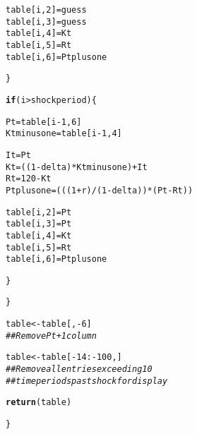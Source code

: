 \documentclass{article}\usepackage[]{graphicx}\usepackage[]{color}
\makeatletter
\newcommand{\hlnum}[1]{\textcolor[rgb]{0.686,0.059,0.569}{#1}}%
\newcommand{\hlcom}[1]{\textcolor[rgb]{0.678,0.584,0.686}{\textit{#1}}}%
\newcommand{\hlopt}[1]{\textcolor[rgb]{0,0,0}{#1}}%
\newcommand{\hlstd}[1]{\textcolor[rgb]{0.345,0.345,0.345}{#1}}%
\newcommand{\hlkwa}[1]{\textcolor[rgb]{0.161,0.373,0.58}{\textbf{#1}}}%
\newcommand{\hlkwb}[1]{\textcolor[rgb]{0.69,0.353,0.396}{#1}}%
\newcommand{\hlkwd}[1]{\textcolor[rgb]{0.737,0.353,0.396}{\textbf{#1}}}%
\newenvironment{kframe}{%
 \def\at@end@of@kframe{}%
 \ifinner\ifhmode%
  \def\at@end@of@kframe{\end{minipage}}%
  \begin{minipage}{\columnwidth}%
 \fi\fi%
 \def\FrameCommand##1{\hskip\@totalleftmargin \hskip-\fboxsep
 \colorbox{shadecolor}{##1}\hskip-\fboxsep
     \hskip-\linewidth \hskip-\@totalleftmargin \hskip\columnwidth}%
 \MakeFramed {\advance\hsize-\width
   \@totalleftmargin\z@ \linewidth\hsize
   \@setminipage}}%
 {\par\unskip\endMakeFramed%
 \at@end@of@kframe}
\newenvironment{knitrout}{}{} %
\makeatother
\begin{document}
\begin{knitrout}
\begin{kframe}
\begin{alltt}
      \hlstd{table[i,}\hlnum{2}\hlstd{]} \hlkwb{=} \hlstd{guess}
      \hlstd{table[i,}\hlnum{3}\hlstd{]} \hlkwb{=} \hlstd{guess}
      \hlstd{table[i,}\hlnum{4}\hlstd{]} \hlkwb{=} \hlstd{Kt}
      \hlstd{table[i,} \hlnum{5}\hlstd{]} \hlkwb{=} \hlstd{Rt}
      \hlstd{table[i,} \hlnum{6}\hlstd{]} \hlkwb{=} \hlstd{Ptplusone}

    \hlstd{\}}

    \hlkwa{if} \hlstd{(i} \hlopt{>} \hlstd{shockperiod)\{}

      \hlstd{Pt} \hlkwb{=} \hlstd{table[i}\hlopt{-}\hlnum{1}\hlstd{,} \hlnum{6}\hlstd{]}
      \hlstd{Ktminusone} \hlkwb{=} \hlstd{table[i}\hlopt{-}\hlnum{1}\hlstd{,}\hlnum{4}\hlstd{]}

      \hlstd{It} \hlkwb{=} \hlstd{Pt}
      \hlstd{Kt} \hlkwb{=} \hlstd{((}\hlnum{1} \hlopt{-} \hlstd{delta)} \hlopt{*} \hlstd{Ktminusone)} \hlopt{+} \hlstd{It}
      \hlstd{Rt} \hlkwb{=} \hlnum{120} \hlopt{-} \hlstd{Kt}
      \hlstd{Ptplusone} \hlkwb{=} \hlstd{(((}\hlnum{1} \hlopt{+} \hlstd{r)} \hlopt{/} \hlstd{(}\hlnum{1} \hlopt{-} \hlstd{delta))} \hlopt{*} \hlstd{(Pt} \hlopt{-} \hlstd{Rt))}

      \hlstd{table[i,}\hlnum{2}\hlstd{]} \hlkwb{=} \hlstd{Pt}
      \hlstd{table[i,}\hlnum{3}\hlstd{]} \hlkwb{=} \hlstd{Pt}
      \hlstd{table[i,}\hlnum{4}\hlstd{]} \hlkwb{=} \hlstd{Kt}
      \hlstd{table[i,} \hlnum{5}\hlstd{]} \hlkwb{=} \hlstd{Rt}
      \hlstd{table[i,} \hlnum{6}\hlstd{]} \hlkwb{=} \hlstd{Ptplusone}

    \hlstd{\}}

  \hlstd{\}}

  \hlstd{table} \hlkwb{<-} \hlstd{table[,}\hlopt{-}\hlnum{6}\hlstd{]}
  \hlcom{## Remove P t + 1 column}

  \hlstd{table} \hlkwb{<-} \hlstd{table[}\hlopt{-}\hlnum{14}\hlopt{:-}\hlnum{100}\hlstd{,]}
  \hlcom{## Remove all entries exceeding 10}
  \hlcom{## time periods past shock for display}

  \hlkwd{return}\hlstd{(table)}

\hlstd{\}}


\end{alltt}
\end{kframe}
\end{knitrout}
\end{document}

